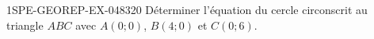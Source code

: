 \begin{exercice}{1SPE-GEOREP-EX-048}{3}{20}
Déterminer l'équation du cercle circonscrit au triangle $ABC$ avec $A(0 ; 0)$, $B(4 ; 0)$ et $C(0 ; 6)$.
\end{exercice}

